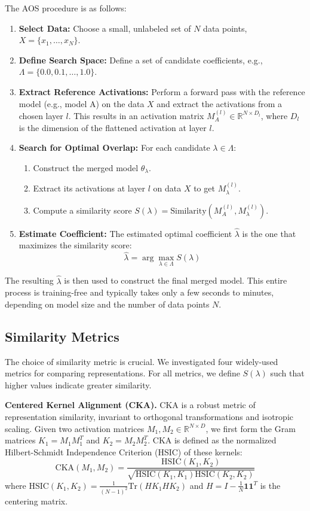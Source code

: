 \documentclass{article}
\theoremstyle{plain}
\theoremstyle{definition}
\theoremstyle{remark}
\begin{document}
The AOS procedure is as follows:
\begin{enumerate}
    \item \textbf{Select Data:} Choose a small, unlabeled set of $N$ data points, $X = \{x_1, \dots, x_N\}$.
    \item \textbf{Define Search Space:} Define a set of candidate coefficients, e.g., $\Lambda = \{0.0, 0.1, \dots, 1.0\}$.
    \item \textbf{Extract Reference Activations:} Perform a forward pass with the reference model (e.g., model A) on the data $X$ and extract the activations from a chosen layer $l$. This results in an activation matrix $M_A^{(l)} \in \mathbb{R}^{N \times D_l}$, where $D_l$ is the dimension of the flattened activation at layer $l$.
    \item \textbf{Search for Optimal Overlap:} For each candidate $\lambda \in \Lambda$:
    \begin{enumerate}
        \item Construct the merged model $\theta_\lambda$.
        \item Extract its activations at layer $l$ on data $X$ to get $M_\lambda^{(l)}$.
        \item Compute a similarity score $S(\lambda) = \text{Similarity}(M_A^{(l)}, M_\lambda^{(l)})$.
    \end{enumerate}
    \item \textbf{Estimate Coefficient:} The estimated optimal coefficient $\hat{\lambda}$ is the one that maximizes the similarity score:
    \begin{equation}
    \hat{\lambda} = \arg\max_{\lambda \in \Lambda} S(\lambda)
    \end{equation}
\end{enumerate}
The resulting $\hat{\lambda}$ is then used to construct the final merged model. This entire process is training-free and typically takes only a few seconds to minutes, depending on model size and the number of data points $N$.

\subsection{Similarity Metrics}
The choice of similarity metric is crucial. We investigated four widely-used metrics for comparing representations. For all metrics, we define $S(\lambda)$ such that higher values indicate greater similarity.

\textbf{Centered Kernel Alignment (CKA).} CKA \citep{kornblith2019similarity} is a robust metric of representation similarity, invariant to orthogonal transformations and isotropic scaling. Given two activation matrices $M_1, M_2 \in \mathbb{R}^{N \times D}$, we first form the Gram matrices $K_1 = M_1 M_1^T$ and $K_2 = M_2 M_2^T$. CKA is defined as the normalized Hilbert-Schmidt Independence Criterion (HSIC) of these kernels:
\begin{equation}
\text{CKA}(M_1, M_2) = \frac{\text{HSIC}(K_1, K_2)}{\sqrt{\text{HSIC}(K_1, K_1) \text{HSIC}(K_2, K_2)}}
\end{equation}
where $\text{HSIC}(K_1, K_2) = \frac{1}{(N-1)^2}\text{Tr}(HK_1HK_2)$ and $H = I - \frac{1}{N}\mathbf{1}\mathbf{1}^T$ is the centering matrix.
\end{document}
